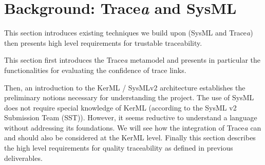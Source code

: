 \section{Background: Trace\textit{a} and SysML}\label{sec:background}
This section introduces existing techniques we build upon (SysML and Trace\textit{a}) then presents high level requirements for trustable traceability.
\sideboxend






This section first introduces the Trace\textit{a} metamodel \cite{batot2021-not-another-metamodel} and presents in particular the functionalities for evaluating the confidence of trace links.   

Then, an introduction to the KerML / SysMLv2 architecture establishes the preliminary notions necessary for understanding the project. The use of SysML does not require special knowledge of KerML (according to the SysML v2 Submission Team (SST)). However, it seems reductive to understand a language without addressing its foundations. We will see how the integration of Trace\textit{a} can and should also be considered at the KerML level.
Finally this section describes the high level requirements for quality traceability as defined in previous deliverables.


